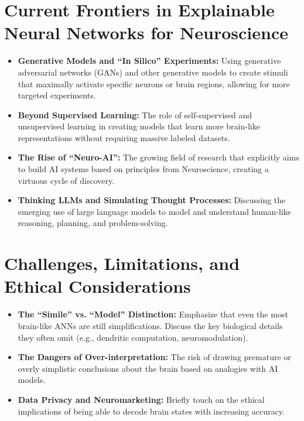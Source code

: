 \documentclass[11pt,a4paper]{article}
\begin{document}
\section{Current Frontiers in Explainable Neural Networks for Neuroscience}
\begin{itemize}
    \item \textbf{Generative Models and ``In Silico'' Experiments:} Using generative adversarial networks (GANs) and other generative models to create stimuli that maximally activate specific neurons or brain regions, allowing for more targeted experiments.
    \item \textbf{Beyond Supervised Learning:} The role of self-supervised and unsupervised learning in creating models that learn more brain-like representations without requiring massive labeled datasets.
    \item \textbf{The Rise of ``Neuro-AI'':} The growing field of research that explicitly aims to build AI systems based on principles from Neuroscience, creating a virtuous cycle of discovery.
    \item \textbf{Thinking LLMs and Simulating Thought Processes:} Discussing the emerging use of large language models to model and understand human-like reasoning, planning, and problem-solving.
\end{itemize}

\section{Challenges, Limitations, and Ethical Considerations}
\begin{itemize}
    \item \textbf{The ``Simile'' vs. ``Model'' Distinction:} Emphasize that even the most brain-like ANNs are still simplifications. Discuss the key biological details they often omit (e.g., dendritic computation, neuromodulation).
    \item \textbf{The Dangers of Over-interpretation:} The risk of drawing premature or overly simplistic conclusions about the brain based on analogies with AI models.
    \item \textbf{Data Privacy and Neuromarketing:} Briefly touch on the ethical implications of being able to decode brain states with increasing accuracy.
\end{itemize}
\end{document}
